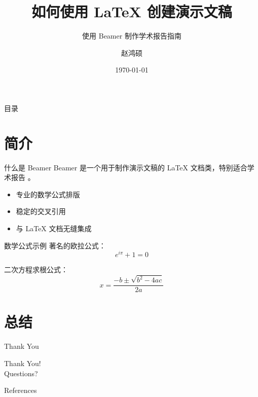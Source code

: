 \documentclass[aspectratio=169]{beamer}
\title{如何使用 \LaTeX{} 创建演示文稿}
\subtitle{使用 Beamer 制作学术报告指南}
\author{赵鸿硕}
\institute{浙江大学国际校区}
\date{\today}
\begin{document}
\begin{frame}
  \titlepage
\end{frame}

\begin{frame}{目录}
  \tableofcontents
\end{frame}

\section{简介}

\begin{frame}{什么是 Beamer}
  Beamer 是一个用于制作演示文稿的 \LaTeX{} 文档类，特别适合学术报告 \cite{beamer}。
  \begin{itemize}
    \item 专业的数学公式排版
    \item 稳定的交叉引用
    \item 与 \LaTeX{} 文档无缝集成
  \end{itemize}
\end{frame}

\begin{frame}{数学公式示例}
  著名的欧拉公式：
  \[
    e^{i\pi} + 1 = 0
  \]
  
  二次方程求根公式：
  \[
    x = \frac{-b \pm \sqrt{b^2 - 4ac}}{2a}
  \]
\end{frame}

\section{总结}

\begin{frame}{Thank You}
  \begin{center}
    \Huge Thank You!\\[1cm]
    \large Questions?
  \end{center}
\end{frame}

\begin{frame}{References}
  \nocite{*}
  
  
\end{frame}
\end{document}
